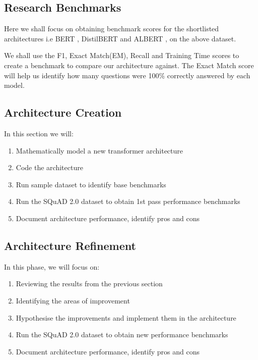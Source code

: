 \documentclass[12pt]{report}
\begin{document}
\begin{appendices}
        \subsection{Research Benchmarks}\label{benchmarks}
        Here we shall focus on obtaining benchmark scores for the shortlisted architectures i.e BERT \citep{bert}, DistilBERT \citep{distil} and ALBERT \cite{albert}, on the above dataset.

        We shall use the F1, Exact Match(EM), Recall and Training Time scores to create a benchmark to compare our architecture against. The Exact Match score will help us identify how many questions were 100\% correctly answered by each model.

        \subsection{Architecture Creation}\label{architecturecreation}
        In this section we will:

        \begin{enumerate}
            \item{Mathematically model a new transformer architecture}
            \item{Code the architecture}
            \item{Run sample dataset to identify base benchmarks}
            \item{Run the SQuAD 2.0 dataset to obtain 1st pass performance benchmarks}
            \item{Document architecture performance, identify pros and cons}
        \end{enumerate}
        \subsection{Architecture Refinement}\label{refinement}
        In this phase, we will focus on:
        \begin{enumerate}
            \item{Reviewing the results from the previous section}
            \item{Identifying the areas of improvement}
            \item{Hypothesise the improvements and implement them in the architecture}
            \item{Run the SQuAD 2.0 dataset to obtain new performance benchmarks}
            \item{Document architecture performance, identify pros and cons}
        \end{enumerate}

\end{appendices}
\end{document}
